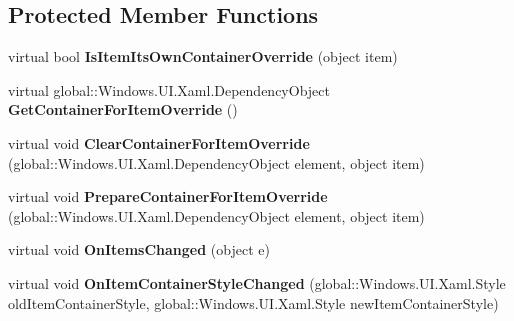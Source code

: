 \subsection*{Protected Member Functions}
\begin{DoxyCompactItemize}
\item 
\mbox{\label{class_windows_1_1_u_i_1_1_xaml_1_1_controls_1_1_items_control_af7c44086f992202e12f3559064216061}} 
virtual bool {\bfseries Is\+Item\+Its\+Own\+Container\+Override} (object item)
\item 
\mbox{\label{class_windows_1_1_u_i_1_1_xaml_1_1_controls_1_1_items_control_a77205f1b95f23b7eac70cb06025fade2}} 
virtual global\+::\+Windows.\+U\+I.\+Xaml.\+Dependency\+Object {\bfseries Get\+Container\+For\+Item\+Override} ()
\item 
\mbox{\label{class_windows_1_1_u_i_1_1_xaml_1_1_controls_1_1_items_control_af3c1217d5a48fec76e474ba4bf48a67a}} 
virtual void {\bfseries Clear\+Container\+For\+Item\+Override} (global\+::\+Windows.\+U\+I.\+Xaml.\+Dependency\+Object element, object item)
\item 
\mbox{\label{class_windows_1_1_u_i_1_1_xaml_1_1_controls_1_1_items_control_ab41bdb021d690e9fd35d99c8455e58cf}} 
virtual void {\bfseries Prepare\+Container\+For\+Item\+Override} (global\+::\+Windows.\+U\+I.\+Xaml.\+Dependency\+Object element, object item)
\item 
\mbox{\label{class_windows_1_1_u_i_1_1_xaml_1_1_controls_1_1_items_control_af4965a6cf05198973920cd4d95c82dbc}} 
virtual void {\bfseries On\+Items\+Changed} (object e)
\item 
\mbox{\label{class_windows_1_1_u_i_1_1_xaml_1_1_controls_1_1_items_control_a6621d703e5349274aade1e24d36daf58}} 
virtual void {\bfseries On\+Item\+Container\+Style\+Changed} (global\+::\+Windows.\+U\+I.\+Xaml.\+Style old\+Item\+Container\+Style, global\+::\+Windows.\+U\+I.\+Xaml.\+Style new\+Item\+Container\+Style)

\end{DoxyCompactItemize}
